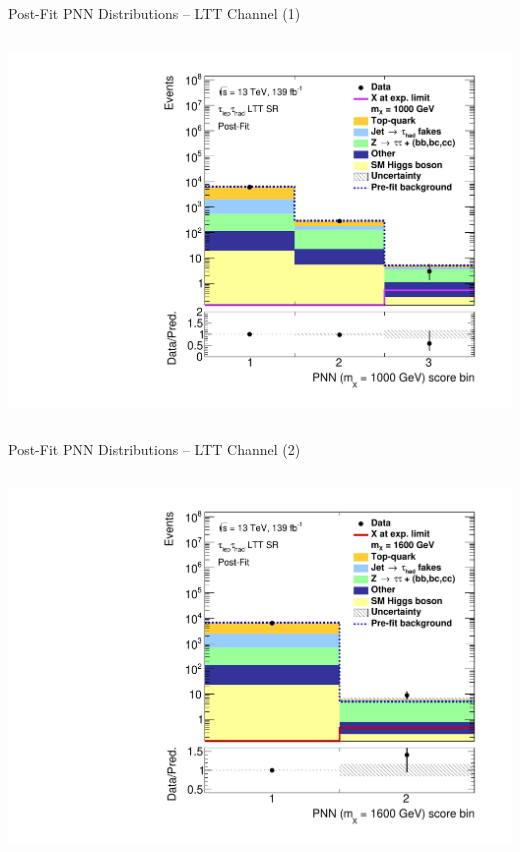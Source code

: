\documentclass[11pt, xcolor={dvipsnames}, aspectratio=169, notes]{beamer}
\begin{document}
\begin{frame}{Post-Fit PNN Distributions -- \allbold{\lephad} LTT Channel (1)}
\begin{columns}
    \centering


    \includegraphics[width=\textwidth]{results_res/postfit/Region_BMin0_incJet1_dist1000_J2_D2HDMPNN_T2_SpcTauLH_Y2015_LTT1_L1_GlobalFit_conditionnal_mu0log}

  \end{columns}
\end{frame}


\begin{frame}{Post-Fit PNN Distributions -- \allbold{\lephad} LTT Channel (2)}
  \begin{columns}
    \centering


    \includegraphics[width=\textwidth]{results_res/postfit/Region_BMin0_incJet1_dist1600_J2_D2HDMPNN_T2_SpcTauLH_Y2015_LTT1_L1_GlobalFit_conditionnal_mu0log}

  \end{columns}
\end{frame}
\end{document}
